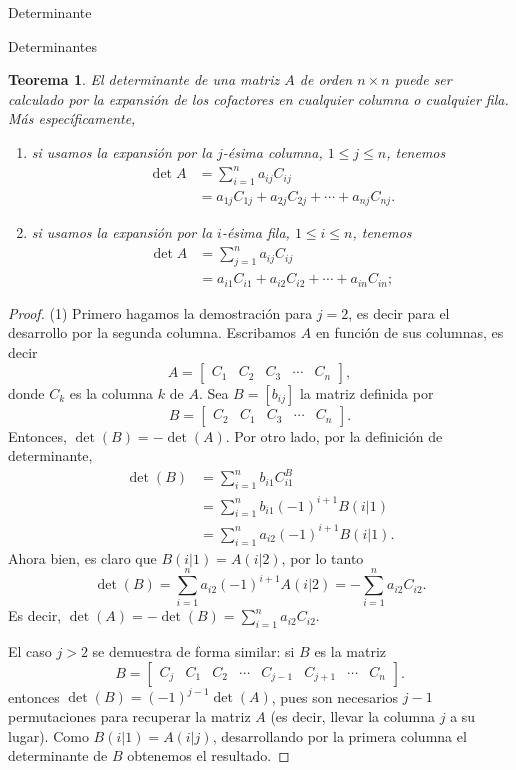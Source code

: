\documentclass[a4paper,12pt,twoside,spanish,reqno]{amsbook}
\newtheorem{teorema}{Teorema}[section]
\theoremstyle{definition}
\theoremstyle{remark}
\begin{document}
\begin{chapter}{Determinante}
\begin{section}{Determinantes}
		 \begin{teorema}\label{th-dessarrollo-por-columnas} El determinante de una matriz $A$ de orden $n \times n$ puede ser calculado por la expansión de los cofactores en  cualquier columna o cualquier fila. Más específicamente, 
		 	\begin{enumerate}
		 		\item si usamos la expansión por la $j$-ésima columna, $1 \le j \le n$, tenemos
		 		\begin{align*}
		 		\det A &= \sum_{i=1}^{n} a_{ij} C_{ij} \\
		 		& = a_{1j}C_{1j}+a_{2j}C_{2j}+\cdots+a_{nj}C_{nj}.
		 		\end{align*} 
		 		\item si usamos la expansión por la $i$-ésima fila, $1 \le i \le n$, tenemos
		 		\begin{align*}
		 		\det A &= \sum_{j=1}^{n} a_{ij} C_{ij} \\
		 		& = a_{i1}C_{i1}+a_{i2}C_{i2}+\cdots+a_{in}C_{in};
		 		\end{align*} 
		 	\end{enumerate}
		 \end{teorema}
		 \begin{proof} (1) Primero hagamos la demostración para $j=2$,  es decir para el desarrollo por la segunda columna.  Escribamos $A$ en función de sus columnas,  es decir 
		 	$$
		 	A = \begin{bmatrix}C_1& C_2&C_3 &\cdots& C_n\end{bmatrix},
		 	$$
		 	donde $C_k$  es la columna $k$ de $A$.
		 	Sea $B=[b_{ij}]$ la matriz definida por
		 	$$
		 	B = \begin{bmatrix} C_2 &C_1 &C_3 &\cdots &C_n\end{bmatrix}.
		 	$$
		 	Entonces, $\det(B) = -\det(A)$. Por otro lado, por la definición de determinante, 
		 	\begin{align*}
		 	\det(B) &=   \sum_{i=1}^{n} b_{i1} C^B_{i1} \\
		 	&= \sum_{i=1}^{n} b_{i1} (-1)^{i+1}B(i|1) \\
		 	& = \sum_{i=1}^{n} a_{i2} (-1)^{i+1}B(i|1).
		 	\end{align*} 
		 	Ahora bien, es claro que $B(i|1) = A(i|2)$, por lo tanto 
		 	$$
		 	\det(B)  = \sum_{i=1}^{n} a_{i2} (-1)^{i+1}A(i|2) = - \sum_{i=1}^{n} a_{i2} C_{i2}.
		 	$$
		 	Es decir, $\det(A) = -\det(B)= \sum_{i=1}^{n} a_{i2} C_{i2}$.
		 	
		 	El caso $j>2$  se demuestra de forma similar: si $B$ es la matriz
		 	$$
		 	B = \begin{bmatrix} C_j &C_1 &C_2 &\cdots& C_{j-1}&C_{j+1}&\cdots &C_n\end{bmatrix}.
		 	$$        
		 	entonces $\det(B)=(-1)^{j-1}\det(A)$, pues son necesarios $j-1$ permutaciones para recuperar la matriz $A$ (es decir, llevar la columna $j$ a su lugar).
		 	Como $B(i|1) = A(i|j)$,  desarrollando por la primera columna el determinante de $B$ obtenemos el resultado.  
		 	

\end{proof}
\end{section}
\end{chapter}
\end{document}
